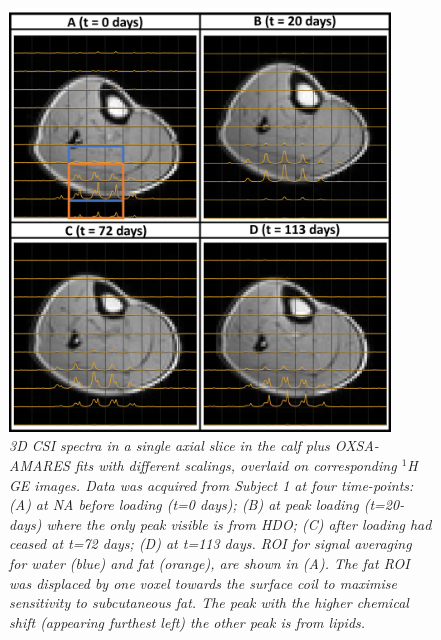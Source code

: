 \begin{figure}
    \centering
    \includegraphics[width=0.9\textwidth]{Figures/Lipid/Calf.png}
    \caption{\textit{3D \ac{CSI} spectra in a single axial slice in the calf plus OXSA-AMARES fits with different scalings, overlaid on corresponding $^1$H \ac{GE} images. Data was acquired from Subject 1 at four time-points: (A) at \ac{NA} before loading (t=0 days); (B) at peak loading (t=20-days) where the only peak visible is from \ac{HDO}; (C) after loading had ceased at t=72 days; (D) at t=113 days. ROI for signal averaging for water (blue) and fat (orange), are shown in (A). The fat \ac{ROI} was displaced by one voxel towards the surface coil to maximise sensitivity to subcutaneous fat. The peak with the higher chemical shift (appearing furthest left) the other peak is from lipids. }}
    \label{fig:Lip:Calf}
\end{figure}

